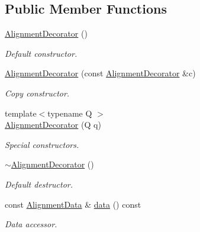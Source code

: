 \subsection*{Public Member Functions}
\begin{DoxyCompactItemize}
\item 
\hyperlink{class_d_d4hep_1_1_alignments_1_1_alignment_decorator_af15dc8788db4b9f8ffdaa366b88bd85b}{AlignmentDecorator} ()
\begin{DoxyCompactList}\small\item\em Default constructor. \item\end{DoxyCompactList}\item 
\hyperlink{class_d_d4hep_1_1_alignments_1_1_alignment_decorator_ae0098f576f3cfd3f2356a2fef9af3245}{AlignmentDecorator} (const \hyperlink{class_d_d4hep_1_1_alignments_1_1_alignment_decorator}{AlignmentDecorator} \&c)
\begin{DoxyCompactList}\small\item\em Copy constructor. \item\end{DoxyCompactList}\item 
{\footnotesize template$<$typename Q $>$ }\\\hyperlink{class_d_d4hep_1_1_alignments_1_1_alignment_decorator_ac557ab3bb22173fc50446f45eb9895a7}{AlignmentDecorator} (Q q)
\begin{DoxyCompactList}\small\item\em Special constructors. \item\end{DoxyCompactList}\item 
\hyperlink{class_d_d4hep_1_1_alignments_1_1_alignment_decorator_a4073c296e3287d0cbdb102b4d0f9f7ba}{$\sim$AlignmentDecorator} ()
\begin{DoxyCompactList}\small\item\em Default destructor. \item\end{DoxyCompactList}\item 
const \hyperlink{class_d_d4hep_1_1_alignments_1_1_alignment_data}{AlignmentData} \& \hyperlink{class_d_d4hep_1_1_alignments_1_1_alignment_decorator_aaf883c9e154e4ffbf53272eb427e09ee}{data} () const 
\begin{DoxyCompactList}\small\item\em Data accessor. \item\end{DoxyCompactList}\item 

\end{DoxyCompactItemize}
